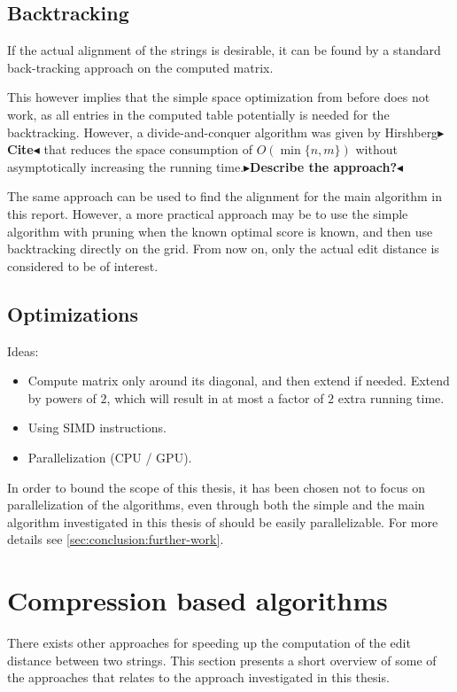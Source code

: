 \documentclass[twoside,11pt,openright]{report}
\newcommand{\todo}[1]{{\color[rgb]{.5,0,0}\textbf{$\blacktriangleright$#1$\blacktriangleleft$}}}
\begin{document}
\subsection{Backtracking}
If the actual alignment of the strings is desirable, it can be found by a standard back-tracking approach on the computed matrix.

This however implies that the simple space optimization from before does not work, as all entries in the computed table potentially is needed for the backtracking. However, a divide-and-conquer algorithm was given by Hirshberg\todo{Cite} that reduces the space consumption of $O(\min\{n, m\})$ without asymptotically increasing the running time.\todo{Describe the approach?}

The same approach can be used to find the alignment for the main algorithm in this report. However, a more practical approach may be to use the simple algorithm with pruning when the known optimal score is known, and then use backtracking directly on the grid. From now on, only the actual edit distance is considered to be of interest.

\subsection{Optimizations}
Ideas:
\begin{itemize}
  \item Compute matrix only around its diagonal, and then extend if needed. Extend by powers of $2$, which will result in at most a factor of $2$ extra running time.
  \item Using SIMD instructions.
  \item Parallelization (CPU / GPU).
\end{itemize}

In order to bound the scope of this thesis, it has been chosen not to focus on parallelization of the algorithms, even through both the simple and the main algorithm investigated in this thesis of \cite{Gawrychowski:2012:FAC:2422024.2422048} should be easily parallelizable. For more details see \ref{sec:conclusion:further-work}.

\section{Compression based algorithms}
There exists other approaches for speeding up the computation of the edit distance between two strings. This section presents a short overview of some of the approaches that relates to the approach investigated in this thesis.
\end{document}
